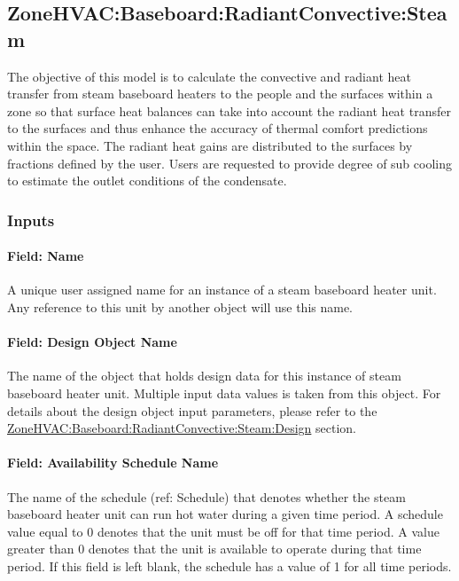\subsection{ZoneHVAC:Baseboard:RadiantConvective:Steam}\label{zonehvacbaseboardradiantconvectivesteam}

The objective of this model is to calculate the convective and radiant heat transfer from steam baseboard heaters to the people and the surfaces within a zone so that surface heat balances can take into account the radiant heat transfer to the surfaces and thus enhance the accuracy of thermal comfort predictions within the space. The radiant heat gains are distributed to the surfaces by fractions defined by the user. Users are requested to provide degree of sub cooling to estimate the outlet conditions of the condensate.

\subsubsection{Inputs}\label{inputs-1-035}

\paragraph{Field: Name}\label{field-name-1-034}

A unique user assigned name for an instance of a steam baseboard heater unit. Any reference to this unit by another object will use this name.

\paragraph{Field: Design Object Name}\label{SteamBB_DesignObjectName}

The name of the object that holds design data for this instance of steam baseboard heater unit. Multiple input data values is taken from this object. For details about the design object input parameters, please refer to the \hyperref[zonehvac-baseboard-radiantconvective-steam-design] {ZoneHVAC:Baseboard:RadiantConvective:Steam:Design} section.

\paragraph{Field: Availability Schedule Name}\label{field-availability-schedule-name-1-010}

The name of the schedule (ref: Schedule) that denotes whether the steam baseboard heater unit can run hot water during a given time period. A schedule value equal to 0 denotes that the unit must be off for that time period. A value greater than 0 denotes that the unit is available to operate during that time period. If this field is left blank, the schedule has a value of 1 for all time periods.


